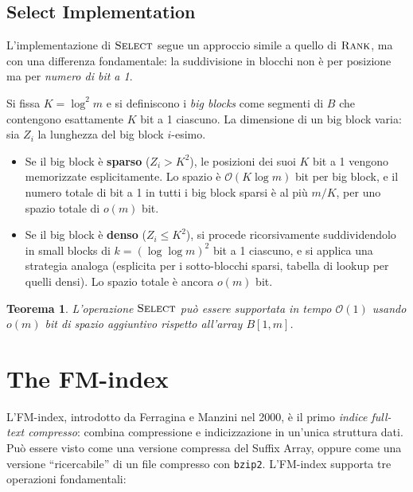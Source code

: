 \documentclass[12pt, a4paper, oneside]{book}
\theoremstyle{plain}
\newtheorem{teorema}{Teorema}[chapter]
\theoremstyle{definition}
\theoremstyle{remark}
\newcommand{\OO}[1]{\mathcal{O}\!\left(#1\right)}
\begin{document}
\subsection{Select Implementation}
\label{subsec:select-impl}

L'implementazione di $\textsc{Select}$ segue un approccio simile a quello di $\textsc{Rank}$, ma con una differenza fondamentale: la suddivisione in blocchi non è per posizione ma per \emph{numero di bit a 1}.

Si fissa $K = \log^2 m$ e si definiscono i \emph{big blocks} come segmenti di $B$ che contengono esattamente $K$ bit a 1 ciascuno. La dimensione di un big block varia: sia $Z_i$ la lunghezza del big block $i$-esimo.

\begin{itemize}
  \item Se il big block è \textbf{sparso} ($Z_i > K^2$), le posizioni dei suoi $K$ bit a 1 vengono memorizzate esplicitamente. Lo spazio è $\OO{K \log m}$ bit per big block, e il numero totale di bit a 1 in tutti i big block sparsi è al più $m / K$, per uno spazio totale di $o(m)$ bit.

  \item Se il big block è \textbf{denso} ($Z_i \le K^2$), si procede ricorsivamente suddividendolo in small blocks di $k = (\log \log m)^2$ bit a 1 ciascuno, e si applica una strategia analoga (esplicita per i sotto-blocchi sparsi, tabella di lookup per quelli densi). Lo spazio totale è ancora $o(m)$ bit.
\end{itemize}

\begin{teorema}
\label{thm:select-succinct}
L'operazione $\textsc{Select}$ può essere supportata in tempo $\OO{1}$ usando $o(m)$ bit di spazio aggiuntivo rispetto all'array $B[1,m]$.
\end{teorema}

\section{The FM-index}
\label{sec:fm-index}

L'FM-index, introdotto da Ferragina e Manzini nel 2000, è il primo \emph{indice full-text compresso}: combina compressione e indicizzazione in un'unica struttura dati. Può essere visto come una versione compressa del Suffix Array, oppure come una versione ``ricercabile'' di un file compresso con \texttt{bzip2}. L'FM-index supporta tre operazioni fondamentali:
\end{document}
